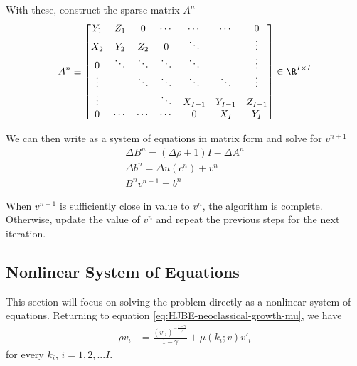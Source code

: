 \documentclass[11pt]{etk-article}
\begin{document}
With these, construct the sparse matrix $A^n$
\begin{align}
A^n &\equiv \begin{bmatrix}
Y_1 & Z_1 & 0 & \cdots & \cdots & \cdots & 0 \\
X_2 & Y_2 & Z_2 & 0 & \ddots& & \vdots \\
0 & \ddots & \ddots & \ddots & \ddots &  & \vdots \\
\vdots & &\ddots & \ddots & \ddots & \ddots  & \vdots \\
\vdots & & & \ddots & X_{I-1} & Y_{I-1}  & Z_{I-1} \\
0 & \cdots & \cdots & \cdots & 0 & X_I & Y_I\\
\end{bmatrix}\in\R^{I\times I}\label{eq:A}\\
\end{align}


We can then write as a system of equations in matrix form and solve for $v^{n+1}$
\begin{align}
\Delta B^n = (\Delta \rho + 1)I - \Delta A^n\\
\Delta b^n = \Delta u(c^n) + v^n\\
B^{n}v^{n+1}= {b^n}
\end{align}



When $v^{n+1}$ is sufficiently close in value to $v^n$, the algorithm is complete. Otherwise, update the value of $v^n$ and repeat the previous steps for the next iteration. 


\subsection{Nonlinear System of Equations}
This section will focus on solving the problem directly as a nonlinear system of equations. Returning to equation \cref{eq:HJBE-neoclassical-growth-mu}, we have 
\begin{align}
\rho v_i &= \frac{\left(v'_i\right)^{-\frac{1-\gamma}{\gamma}}}{1-\gamma} + \mu(k_i;v) v'_i
\end{align}
for every $k_i$, $i=1,2,...I$.


\end{document}

